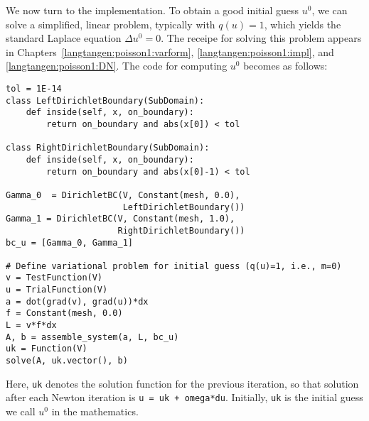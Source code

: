 We now turn to the implementation.
To obtain a good initial guess $u^0$, we can solve a simplified, linear
problem, typically with $q(u)=1$, which yields the standard Laplace
equation $\Delta u^0 =0$. The receipe for solving this problem
appears in Chapters~\ref{langtangen:poisson1:varform},
\ref{langtangen:poisson1:impl}, and \ref{langtangen:poisson1:DN}. 
The code for computing $u^0$ becomes as follows:
\begin{Verbatim}[fontsize=\fontsize{10pt}{10pt},tabsize=8,baselinestretch=1.05,
fontfamily=tt,xleftmargin=7mm]
tol = 1E-14
class LeftDirichletBoundary(SubDomain):
    def inside(self, x, on_boundary):
        return on_boundary and abs(x[0]) < tol

class RightDirichletBoundary(SubDomain):
    def inside(self, x, on_boundary):
        return on_boundary and abs(x[0]-1) < tol

Gamma_0  = DirichletBC(V, Constant(mesh, 0.0),
                       LeftDirichletBoundary())
Gamma_1 = DirichletBC(V, Constant(mesh, 1.0),
                      RightDirichletBoundary())
bc_u = [Gamma_0, Gamma_1]

# Define variational problem for initial guess (q(u)=1, i.e., m=0)
v = TestFunction(V)
u = TrialFunction(V)
a = dot(grad(v), grad(u))*dx
f = Constant(mesh, 0.0)
L = v*f*dx
A, b = assemble_system(a, L, bc_u)
uk = Function(V)
solve(A, uk.vector(), b)
\end{Verbatim}
\noindent
Here, {\fontsize{12pt}{12pt}\texttt{uk}} denotes the solution function for the previous
iteration, so that solution
after each Newton iteration is {\fontsize{12pt}{12pt}\texttt{u = uk + omega*du}}.
Initially, {\fontsize{12pt}{12pt}\texttt{uk}} is the initial guess we call $u^0$ in the mathematics.



